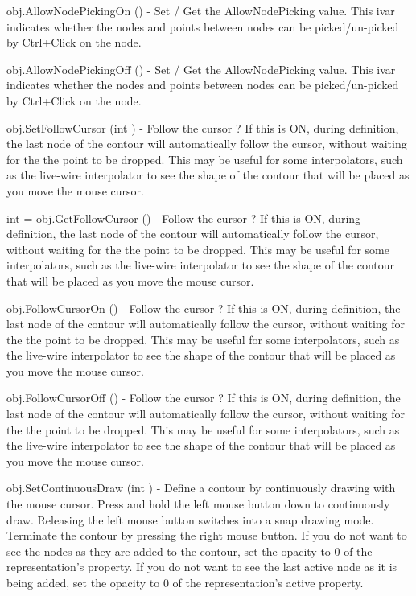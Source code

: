 \begin{DoxyItemize}
\item {\ttfamily obj.\-Allow\-Node\-Picking\-On ()} -\/ Set / Get the Allow\-Node\-Picking value. This ivar indicates whether the nodes and points between nodes can be picked/un-\/picked by Ctrl+\-Click on the node.  
\item {\ttfamily obj.\-Allow\-Node\-Picking\-Off ()} -\/ Set / Get the Allow\-Node\-Picking value. This ivar indicates whether the nodes and points between nodes can be picked/un-\/picked by Ctrl+\-Click on the node.  
\item {\ttfamily obj.\-Set\-Follow\-Cursor (int )} -\/ Follow the cursor ? If this is O\-N, during definition, the last node of the contour will automatically follow the cursor, without waiting for the the point to be dropped. This may be useful for some interpolators, such as the live-\/wire interpolator to see the shape of the contour that will be placed as you move the mouse cursor.  
\item {\ttfamily int = obj.\-Get\-Follow\-Cursor ()} -\/ Follow the cursor ? If this is O\-N, during definition, the last node of the contour will automatically follow the cursor, without waiting for the the point to be dropped. This may be useful for some interpolators, such as the live-\/wire interpolator to see the shape of the contour that will be placed as you move the mouse cursor.  
\item {\ttfamily obj.\-Follow\-Cursor\-On ()} -\/ Follow the cursor ? If this is O\-N, during definition, the last node of the contour will automatically follow the cursor, without waiting for the the point to be dropped. This may be useful for some interpolators, such as the live-\/wire interpolator to see the shape of the contour that will be placed as you move the mouse cursor.  
\item {\ttfamily obj.\-Follow\-Cursor\-Off ()} -\/ Follow the cursor ? If this is O\-N, during definition, the last node of the contour will automatically follow the cursor, without waiting for the the point to be dropped. This may be useful for some interpolators, such as the live-\/wire interpolator to see the shape of the contour that will be placed as you move the mouse cursor.  
\item {\ttfamily obj.\-Set\-Continuous\-Draw (int )} -\/ Define a contour by continuously drawing with the mouse cursor. Press and hold the left mouse button down to continuously draw. Releasing the left mouse button switches into a snap drawing mode. Terminate the contour by pressing the right mouse button. If you do not want to see the nodes as they are added to the contour, set the opacity to 0 of the representation's property. If you do not want to see the last active node as it is being added, set the opacity to 0 of the representation's active property.  

\end{DoxyItemize}
